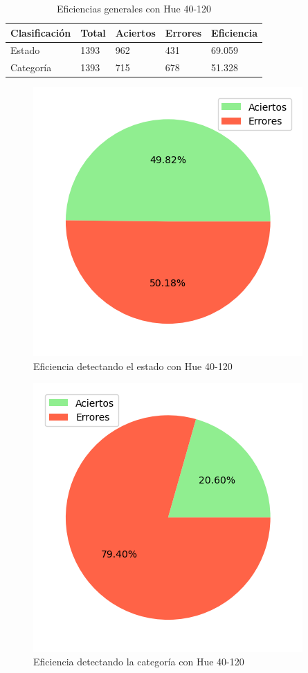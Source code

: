 \begin{table}[H]
\centering
\begin{tabular}{|l|l|l|l|l|}
\hline 
\textbf{Clasificación} & \textbf{Total} & \textbf{Aciertos} & \textbf{Errores} & \textbf{Eficiencia} \\
\hline
Estado & 1393 & 962 & 431 & 69.059 \\
\hline 
Categoría & 1393 & 715 & 678 & 51.328 \\
\hline 
\end{tabular}
\caption{Eficiencias generales con Hue 40-120}
\label{table:efficiency_general_40_120}
\end{table}

\captionsetup[figure]{skip=-10pt}

\begin{figure}[H]
\centering
\includegraphics[scale=0.6]{images/result_global_state_40_120.png}
\caption{Eficiencia detectando el estado con Hue 40-120}
\label{img:efficiency_state_40_120}
\end{figure}

\begin{figure}[H]
\centering
\includegraphics[scale=0.6]{images/result_global_class_40_120.png}
\caption{Eficiencia detectando la categoría con Hue 40-120}
\label{img:efficiency_category_40_120}
\end{figure}

